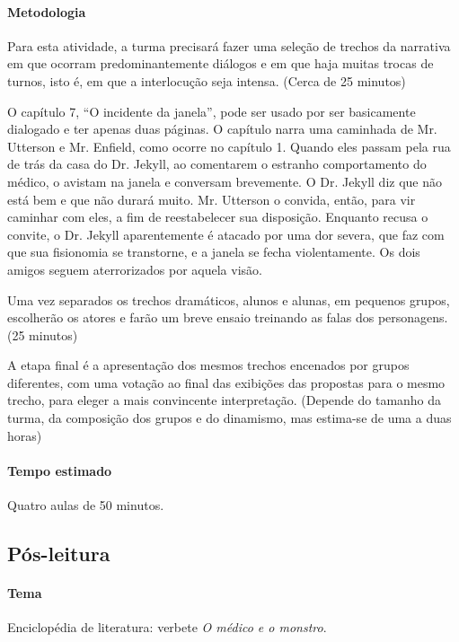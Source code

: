 \documentclass[12pt]{extarticle}
\begin{document}
\paragraph{Metodologia}
Para esta atividade, a turma precisará fazer uma seleção de trechos da
narrativa em que ocorram predominantemente diálogos e em que haja muitas
trocas de turnos, isto é, em que a interlocução seja intensa. (Cerca de
25 minutos)

O capítulo 7, ``O incidente da janela'', pode ser usado por ser
basicamente dialogado e ter apenas duas páginas. O capítulo narra uma
caminhada de Mr. Utterson e Mr. Enfield, como ocorre no capítulo 1.
Quando eles passam pela rua de trás da casa do Dr. Jekyll, ao comentarem
o estranho comportamento do médico, o avistam na janela e conversam
brevemente. O Dr. Jekyll diz que não está bem e que não durará muito.
Mr. Utterson o convida, então, para vir caminhar com eles, a fim de
reestabelecer sua disposição. Enquanto recusa o convite, o Dr. Jekyll
aparentemente é atacado por uma dor severa, que faz com que sua
fisionomia se transtorne, e a janela se fecha violentamente. Os dois
amigos seguem aterrorizados por aquela visão.

Uma vez separados os trechos dramáticos, alunos e alunas, em pequenos
grupos, escolherão os atores e farão um breve ensaio treinando as falas
dos personagens. (25 minutos)

A etapa final é a apresentação dos mesmos trechos encenados por grupos
diferentes, com uma votação ao final das exibições das propostas para o
mesmo trecho, para eleger a mais convincente interpretação. (Depende do
tamanho da turma, da composição dos grupos e do dinamismo, mas estima-se
de uma a duas horas)

\paragraph{Tempo estimado} Quatro aulas de 50 minutos.

\subsection{Pós-leitura} 

\paragraph{Tema} Enciclopédia de literatura: verbete \emph{O médico e o
monstro}.

\end{document}
